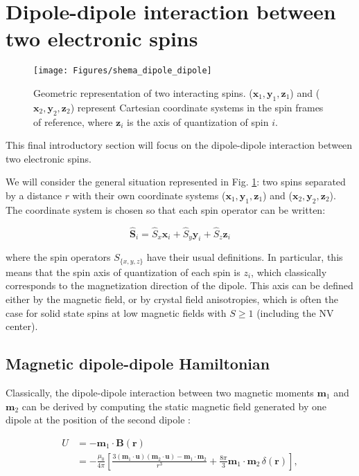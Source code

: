 \documentclass[a4paper,11pt]{report}
\begin{document}
\section{Dipole-dipole interaction between two electronic spins}

\begin{figure}[h!]
\centering
\texttt{[image: Figures/shema\_dipole\_dipole]}
\caption{Geometric representation of two interacting spins. ($\mathbf{x}_1,\mathbf{y}_1,\mathbf{z}_1$) and ($\mathbf{x}_2,\mathbf{y}_2,\mathbf{z}_2$) represent Cartesian coordinate systems in the spin frames of reference, where $\mathbf{z}_i$ is the axis of quantization of spin $i$.} 
\label{dipole-dipole}
\end{figure}

This final introductory section will focus on the dipole-dipole interaction between two electronic spins. 

We will consider the general situation represented in Fig. \ref{dipole-dipole}: two spins separated by a distance $r$ with their own coordinate systems ($\mathbf{x}_1,\mathbf{y}_1,\mathbf{z}_1$) and ($\mathbf{x}_2,\mathbf{y}_2,\mathbf{z}_2$). The coordinate system is chosen so that each spin operator can be written:

\begin{equation}
\hat{\mathbf{S}}_i=\hat{S}_x \mathbf{x}_i + \hat{S}_y \mathbf{y}_i + \hat{S}_z \mathbf{z}_i
\end{equation}

where the spin operators $S_{\{x,y,z\} }$ have their usual definitions. In particular, this means that the spin axis of quantization of each spin is $z_i$, which classically corresponds to the magnetization direction of the dipole. This axis can be defined either by the magnetic field, or by crystal field anisotropies, which is often the case for solid state spins at low magnetic fields with $S\geq 1$  (including the NV center).

\subsection{Magnetic dipole-dipole Hamiltonian}

Classically, the dipole-dipole interaction between two magnetic moments $\mathbf{m}_1$ and $\mathbf{m}_2$ can be derived by computing the static magnetic field generated by one dipole at the position of the second dipole \cite[p.~188]{jackson1999classical}:

\begin{align}
U&=-\mathbf{m}_1 \cdot \mathbf{B}(\mathbf{r}) \nonumber \\
&=-\frac{\mu_0}{4 \pi}\left[ \frac{3 (\mathbf{m}_1\cdot\mathbf{u})(\mathbf{m}_2\cdot\mathbf{u}) - \mathbf{m}_1\cdot\mathbf{m}_2}{r^3}+\frac{8\pi}{3}\mathbf{m}_1\cdot\mathbf{m}_2\,\delta(\mathbf{r})\right], \label{eq. dipole classique}
\end{align}
\end{document}
